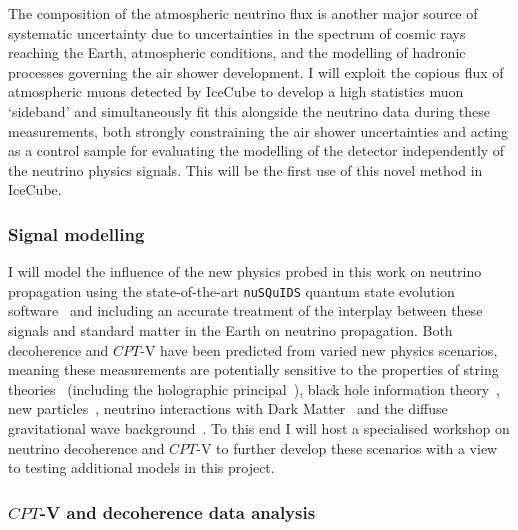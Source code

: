 \documentclass[a4paper,11pt]{article}
\begin{document}
The composition of the atmospheric neutrino flux is another major source of systematic uncertainty due to uncertainties in the spectrum of cosmic rays reaching the Earth, atmospheric conditions, and the modelling of hadronic processes governing the air shower development. I will exploit the copious flux of atmospheric muons detected by IceCube to develop a high statistics muon `sideband' and simultaneously fit this alongside the neutrino data during these measurements, both strongly constraining the air shower uncertainties and acting as a control sample for evaluating the modelling of the detector independently of the neutrino physics signals. This will be the first use of this novel method in IceCube. \\



\subsubsection{Signal modelling}

I will model the influence of the new physics probed in this work on neutrino propagation using the state-of-the-art \texttt{nuSQuIDS} quantum state evolution software~\cite{Delgado:2014kpa, nusquidsGIT} and including an accurate treatment of the interplay between these signals and standard matter in the Earth on neutrino propagation. Both decoherence and $CPT$-V have been predicted from varied new physics scenarios, meaning these measurements are potentially sensitive to the properties of string theories~\cite{Mavromatos2010, AmelinoCamelia:2008qg} (including the holographic principal~\cite{Perlman_2015, Harlow:2018jwu}), black hole information theory~\cite{PhysRevD.102.115003, Hellmann:2021jyz}, new particles~\cite{Hellmann:2021jyz}, neutrino interactions with Dark Matter~\cite{1909.11271, EPJC802020, Capozzi:2018bps, 1904.02518} and the diffuse gravitational wave background~\cite{PhysRevD.100.096014}. To this end I will host a specialised workshop on neutrino decoherence and $CPT$-V to further develop these scenarios with a view to testing additional models in this project. \\

\subsubsection{$CPT$-V and decoherence data analysis}
\end{document}
